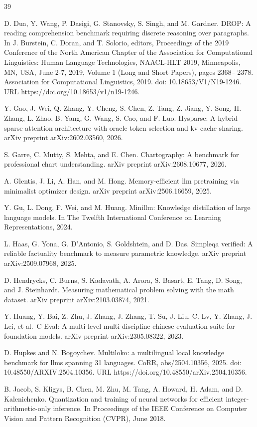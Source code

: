 \documentclass[
  10
]{article}
\begin{document}
39

D. Dua, Y. Wang, P. Dasigi, G. Stanovsky, S. Singh, and M. Gardner.
DROP: A reading comprehension benchmark requiring discrete reasoning
over paragraphs. In J. Burstein, C. Doran, and T. Solorio, editors,
Proceedings of the 2019 Conference of the North American Chapter of the
Association for Computational Linguistics: Human Language Technologies,
NAACL-HLT 2019, Minneapolis, MN, USA, June 2-7, 2019, Volume 1 (Long and
Short Papers), pages 2368-- 2378. Association for Computational
Linguistics, 2019. doi: 10.18653/V1/N19-1246. URL
https://doi.org/10.18653/v1/n19-1246.

Y. Gao, J. Wei, Q. Zhang, Y. Cheng, S. Chen, Z. Tang, Z. Jiang, Y. Song,
H. Zhang, L. Zhao, B. Yang, G. Wang, S. Cao, and F. Luo. Hysparse: A
hybrid sparse attention architecture with oracle token selection and kv
cache sharing. arXiv preprint arXiv:2602.03560, 2026.

S. Garre, C. Mutty, S. Mehta, and E. Chen. Chartography: A benchmark for
professional chart understanding. arXiv preprint arXiv:2608.10677, 2026.

A. Glentis, J. Li, A. Han, and M. Hong. Memory-efficient llm pretraining
via minimalist optimizer design. arXiv preprint arXiv:2506.16659, 2025.

Y. Gu, L. Dong, F. Wei, and M. Huang. Minillm: Knowledge distillation of
large language models. In The Twelfth International Conference on
Learning Representations, 2024.

L. Haas, G. Yona, G. D'Antonio, S. Goldshtein, and D. Das. Simpleqa
verified: A reliable factuality benchmark to measure parametric
knowledge. arXiv preprint arXiv:2509.07968, 2025.

D. Hendrycks, C. Burns, S. Kadavath, A. Arora, S. Basart, E. Tang, D.
Song, and J. Steinhardt. Measuring mathematical problem solving with the
math dataset. arXiv preprint arXiv:2103.03874, 2021.

Y. Huang, Y. Bai, Z. Zhu, J. Zhang, J. Zhang, T. Su, J. Liu, C. Lv, Y.
Zhang, J. Lei, et al.~C-Eval: A multi-level multi-discipline chinese
evaluation suite for foundation models. arXiv preprint arXiv:2305.08322,
2023.

D. Hupkes and N. Bogoychev. Multiloko: a multilingual local knowledge
benchmark for llms spanning 31 languages. CoRR, abs/2504.10356, 2025.
doi: 10.48550/ARXIV.2504.10356. URL
https://doi.org/10.48550/arXiv.2504.10356.

B. Jacob, S. Kligys, B. Chen, M. Zhu, M. Tang, A. Howard, H. Adam, and
D. Kalenichenko. Quantization and training of neural networks for
efficient integer-arithmetic-only inference. In Proceedings of the IEEE
Conference on Computer Vision and Pattern Recognition (CVPR), June 2018.
\end{document}
